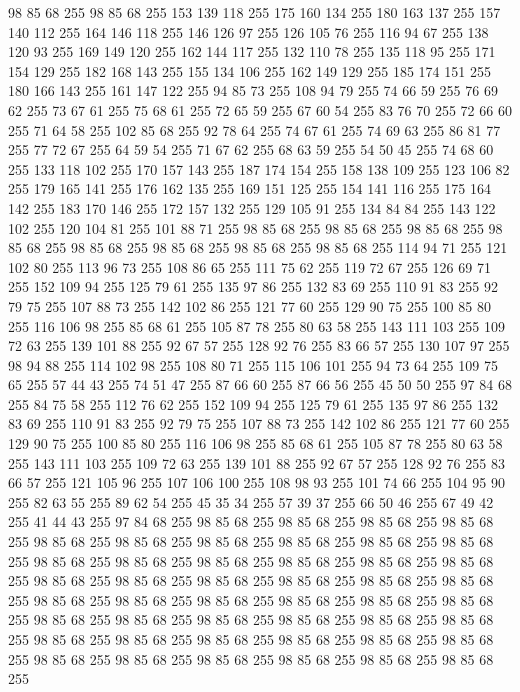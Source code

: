 98 85 68 255 98 85 68 255 153 139 118 255 175 160 134 255 180 163 137 255 157 140 112 255 164 146 118 255 146 126 97 255 126 105 76 255 116 94 67 255 138 120 93 255 169 149 120 255 162 144 117 255 132 110 78 255 135 118 95 255 171 154 129 255 182 168 143 255 155 134 106 255 162 149 129 255 185 174 151 255 180 166 143 255 161 147 122 255 94 85 73 255 108 94 79 255 74 66 59 255 76 69 62 255 73 67 61 255 75 68 61 255 72 65 59 255 67 60 54 255 83 76 70 255 72 66 60 255 71 64 58 255 102 85 68 255 92 78 64 255 74 67 61 255 74 69 63 255 86 81 77 255 77 72 67 255 64 59 54 255 71 67 62 255 68 63 59 255 54 50 45 255 74 68 60 255 133 118 102 255 170 157 143 255 187 174 154 255 158 138 109 255 123 106 82 255 179 165 141 255 176 162 135 255 169 151 125 255 154 141 116 255 175 164 142 255 183 170 146 255 172 157 132 255 129 105 91 255 134 84 84 255 143 122 102 255 120 104 81 255 101 88 71 255 98 85 68 255 98 85 68 255 98 85 68 255
98 85 68 255 98 85 68 255 98 85 68 255 98 85 68 255 98 85 68 255 114 94 71 255 121 102 80 255 113 96 73 255 108 86 65 255 111 75 62 255 119 72 67 255 126 69 71 255 152 109 94 255 125 79 61 255 135 97 86 255 132 83 69 255 110 91 83 255 92 79 75 255 107 88 73 255 142 102 86 255 121 77 60 255 129 90 75 255 100 85 80 255 116 106 98 255 85 68 61 255 105 87 78 255 80 63 58 255 143 111 103 255 109 72 63 255 139 101 88 255 92 67 57 255 128 92 76 255 83 66 57 255 130 107 97 255 98 94 88 255 114 102 98 255 108 80 71 255 115 106 101 255 94 73 64 255 109 75 65 255 57 44 43 255 74 51 47 255 87 66 60 255 87 66 56 255 45 50 50 255 97 84 68 255 84 75 58 255 112 76 62 255 152 109 94 255 125 79 61 255 135 97 86 255 132 83 69 255 110 91 83 255 92 79 75 255 107 88 73 255 142 102 86 255 121 77 60 255 129 90 75 255 100 85 80 255 116 106 98 255 85 68 61 255 105 87 78 255 80 63 58 255 143 111 103 255
109 72 63 255 139 101 88 255 92 67 57 255 128 92 76 255 83 66 57 255 121 105 96 255 107 106 100 255 108 98 93 255 101 74 66 255 104 95 90 255 82 63 55 255 89 62 54 255 45 35 34 255 57 39 37 255 66 50 46 255 67 49 42 255 41 44 43 255 97 84 68 255 98 85 68 255 98 85 68 255 98 85 68 255 98 85 68 255 98 85 68 255 98 85 68 255 98 85 68 255 98 85 68 255 98 85 68 255 98 85 68 255 98 85 68 255 98 85 68 255 98 85 68 255 98 85 68 255 98 85 68 255 98 85 68 255 98 85 68 255 98 85 68 255 98 85 68 255 98 85 68 255 98 85 68 255 98 85 68 255 98 85 68 255 98 85 68 255 98 85 68 255 98 85 68 255 98 85 68 255 98 85 68 255 98 85 68 255 98 85 68 255 98 85 68 255 98 85 68 255 98 85 68 255 98 85 68 255 98 85 68 255 98 85 68 255 98 85 68 255 98 85 68 255 98 85 68 255 98 85 68 255 98 85 68 255 98 85 68 255 98 85 68 255 98 85 68 255 98 85 68 255 98 85 68 255
